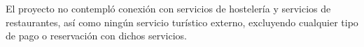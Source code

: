 
El proyecto no contempló conexión con servicios de hostelería y servicios de restaurantes, así como ningún servicio turístico externo, excluyendo cualquier tipo de pago o reservación con dichos servicios. \\
